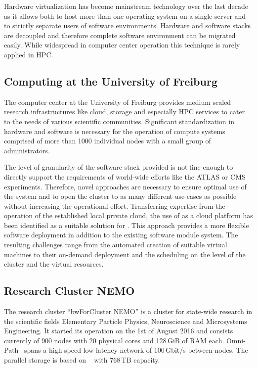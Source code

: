 Hardware virtualization has become mainstream technology over the last decade as it allows
both to host more than one operating system on a single server and to strictly
separate users of software environments.
Hardware and software stacks are decoupled and therefore complete software
environment can be migrated easily.
While widespread in computer center
operation this technique is rarely applied in HPC.

\subsection{Computing at the University of Freiburg}

The computer center at the University of Freiburg provides
medium scaled research
infrastructures like cloud, storage and especially HPC services to cater to the
needs of various scientific communities. Significant standardization
in hardware and software is necessary for the operation of compute systems comprised of
more than 1000 individual nodes with a small group of administrators.

The level of granularity of the software stack provided is not fine enough to
directly support the requirements of world-wide efforts like the
ATLAS or CMS experiments.
Therefore, novel approaches are necessary to ensure optimal use of the system and to open the cluster to as many different use-cases as
possible without increasing the operational effort.
Transferring expertise from the operation of the established local
private cloud, %
the use of \Openstack as a cloud platform has been identified
as a
suitable solution for \NEMO. This approach provides a more flexible software
deployment in addition to the existing software module system.
The resulting challenges range from the automated creation of suitable
virtual machines to their on-demand deployment and the scheduling on
the level of the cluster and the virtual resources.

\subsection{Research Cluster NEMO}

The research cluster ``bwForCluster NEMO'' is a cluster for state-wide
research in the scientific fields Elementary Particle Physics, Neuroscience and
Microsystems Engineering. It started its operation on the 1st of August 2016
and consists currently of 900 nodes with 20 physical cores and 128\,GiB of RAM each.
Omni-Path~\cite{Omnipath} spans a high speed low latency network of 100\,Gbit/s between nodes.
The parallel storage is based on \BeeGFS~\cite{BeeGFS} with
768\,TB capacity.

